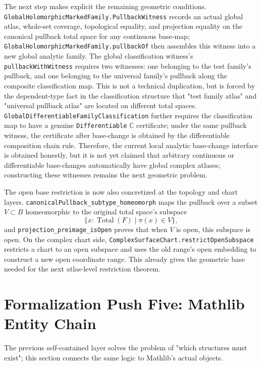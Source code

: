 \documentclass[UTF8,a4paper,11pt]{article}
\begin{document}
\par
The next step makes explicit the remaining geometric conditions.
\texttt{GlobalHolomorphic\allowbreak Marked\allowbreak Family\allowbreak.Pullback\allowbreak Witness} records an actual global atlas, whole-set coverage, topological equality, and projection equality on the canonical pullback total space for any continuous base-map;
\texttt{GlobalHolomorphic\allowbreak Marked\allowbreak Family\allowbreak.pullbackOf} then assembles this witness into a new global analytic family.
The global classification witness's \texttt{pullbackWithWitness} requires two witnesses: one belonging to the test family's pullback, and one belonging to the universal family's pullback along the composite classification map.
This is not a technical duplication, but is forced by the dependent-type fact in the classification structure that "test family atlas" and "universal pullback atlas" are located on different total spaces.
\texttt{GlobalDifferentiable\allowbreak Family\allowbreak Classification} further requires the classification map to have a genuine
\texttt{Differentiable\allowbreak} \(\mathbb C\) certificate; under the same pullback witness, the certificate after base-change is obtained by the differentiable composition chain rule.
Therefore, the current local analytic base-change interface is obtained honestly, but it is not yet claimed that arbitrary continuous or differentiable base-changes automatically have global complex atlases; constructing these witnesses remains the next geometric problem.
\par
The open base restriction is now also concretized at the topology and chart layers. \texttt{canonicalPullback\_subtype\_homeomorph} maps
the pullback over a subset \(V\subset B\) homeomorphic to the original total space's subspace
\[
  \{x:\operatorname{Total}(F)\mid \pi(x)\in V\},
\]
and \texttt{projection\_preimage\_isOpen} proves that when \(V\) is open, this subspace is open.
On the complex chart side, \texttt{ComplexSurfaceChart\allowbreak.restrictOpenSubspace} restricts a chart to an open subspace and uses the old range's open embedding to construct a new open coordinate range. This already gives the geometric base needed for the next atlas-level restriction theorem.

\section{Formalization Push Five: Mathlib Entity Chain}

The previous self-contained layer solves the problem of "which structures must exist"; this section connects the same logic to Mathlib's actual objects.
\end{document}
